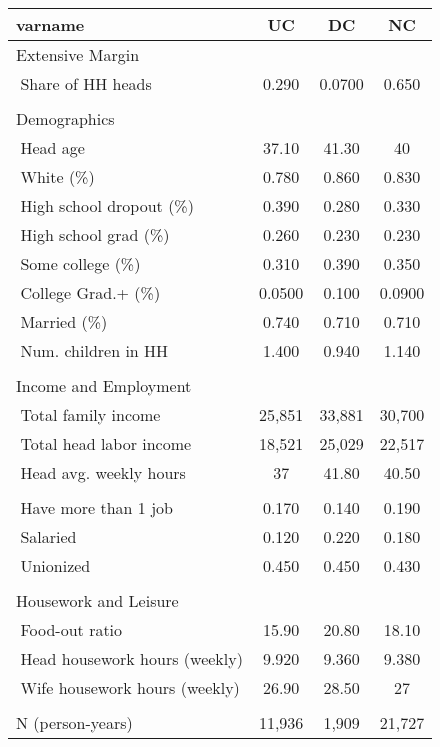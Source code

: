 \begin{tabular}{lccc} \hline
varname & UC & DC & NC \\ \hline
Extensive Margin &  &  &  \\
$\;$Share of HH heads & 0.290 & 0.0700 & 0.650 \\
 &  &  &  \\
Demographics &  &  &  \\
$\;$Head age & 37.10 & 41.30 & 40 \\
$\;$White (\%) & 0.780 & 0.860 & 0.830 \\
$\;$High school dropout (\%) & 0.390 & 0.280 & 0.330 \\
$\;$High school grad (\%) & 0.260 & 0.230 & 0.230 \\
$\;$Some college (\%) & 0.310 & 0.390 & 0.350 \\
$\;$College Grad.+ (\%) & 0.0500 & 0.100 & 0.0900 \\
$\;$Married (\%) & 0.740 & 0.710 & 0.710 \\
$\;$Num. children in HH & 1.400 & 0.940 & 1.140 \\
 &  &  &  \\
Income and Employment &  &  &  \\
$\;$Total family income & 25,851 & 33,881 & 30,700 \\
$\;$Total head labor income & 18,521 & 25,029 & 22,517 \\
$\;$Head avg. weekly hours & 37 & 41.80 & 40.50 \\
 &  &  &  \\
$\;$Have more than 1 job & 0.170 & 0.140 & 0.190 \\
$\;$Salaried & 0.120 & 0.220 & 0.180 \\
$\;$Unionized & 0.450 & 0.450 & 0.430 \\
 &  &  &  \\
Housework and Leisure &  &  &  \\
$\;$Food-out ratio & 15.90 & 20.80 & 18.10 \\
$\;$Head housework hours (weekly) & 9.920 & 9.360 & 9.380 \\
$\;$Wife housework hours (weekly) & 26.90 & 28.50 & 27 \\
 &  &  &  \\
 N (person-years) & 11,936 & 1,909 & 21,727 \\ \hline
\end{tabular}
